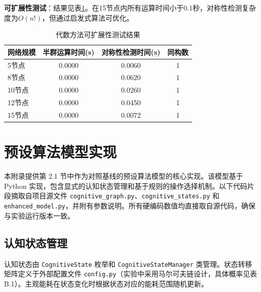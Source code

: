 \documentclass[12pt,a4paper]{article}
\begin{document}
\textbf{可扩展性测试}：结果见表\ref{tab:app_scalability}。在15节点内所有运算时间小于0.1秒，对称性检测复杂度为$O(n!)$，但通过启发式算法可优化。

\begin{table}[H]
\centering
\caption{代数方法可扩展性测试结果}
\label{tab:app_scalability}
\begin{tabular}{lccc}
\toprule
\textbf{网络规模} & \textbf{半群运算时间(s)} & \textbf{对称性检测时间(s)} & \textbf{同构数} \\
\midrule
5节点 & 0.0000 & 0.0060 & 1 \\
8节点 & 0.0000 & 0.0620 & 1 \\
10节点 & 0.0000 & 0.0260 & 1 \\
12节点 & 0.0000 & 0.0450 & 1 \\
15节点 & 0.0000 & 0.0072 & 1 \\
\bottomrule
\end{tabular}
\end{table}

\section{预设算法模型实现}
\label{app:preset_model}

本附录提供第 2.1 节中作为对照基线的预设算法模型的核心实现。该模型基于 Python 实现，包含显式的认知状态管理和基于规则的操作选择机制。以下代码片段摘取自项目源文件 \texttt{cognitive\_graph.py}、\texttt{cognitive\_states.py} 和 \texttt{enhanced\_model.py}，并附有参数说明。所有硬编码数值均直接取自源代码，确保与实验运行版本一致。

\subsection{认知状态管理}
认知状态由 \texttt{CognitiveState} 枚举和 \texttt{CognitiveStateManager} 类管理。状态转移矩阵定义于外部配置文件 \texttt{config.py}（实验中采用马尔可夫链设计，具体概率见表 B.1）。主观能耗在状态变化时根据状态对应的能耗范围随机更新。
\end{document}
